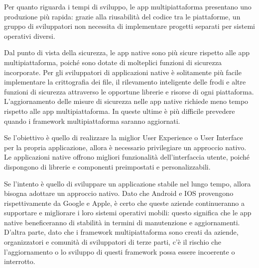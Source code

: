 Per quanto riguarda i tempi di sviluppo, le app multipiattaforma presentano uno produzione pi\`u rapida: grazie alla riusabilit\`a del codice tra le piattaforme, un gruppo di sviluppatori
non necessita di implementare progetti separati per sistemi operativi diversi.

Dal punto di vista della sicurezza, le app native sono pi\`u sicure rispetto alle app multipiattaforma, poich\'e sono dotate di molteplici funzioni di sicurezza incorporate.
Per gli sviluppatori di applicazioni native \`e solitamente pi\`u facile implementare la crittografia dei file, il rilevamento inteligente delle frodi e altre
funzioni di sicurezza attraverso le opportune librerie e risorse di ogni piattaforma. L'aggiornamento delle misure di sicurezza nelle app native richiede meno tempo rispetto alle app multipiattaforma.
In queste ultime \`e pi\`u difficile prevedere quando i framework multipiattaforma saranno aggiornati.

Se l'obiettivo \`e quello di realizzare la miglior User Experience o User Interface per la propria applicazione, allora \`e necessario privilegiare un approccio nativo. Le applicazioni native offrono migliori funzionalit\`a
dell'interfaccia utente, poich\'e dispongono di librerie e componenti preimpostati e personalizzabili.

Se l'intento \`e quello di sviluppare un applicazione stabile nel lungo tempo, allora bisogna adottare un approccio nativo. Dato che Android e IOS provengono rispettivamente da Google e Apple,
\`e certo che queste aziende continueranno a supportare e migliorare i loro sistemi operativi mobili: questo significa che le app native beneficeranno di stabilit\`a in termini di manutenzione e aggiornamenti. D'altra parte, dato che i framework multipiattaforma sono creati da aziende, organizzatori e comunit\`a di sviluppatori di terze parti, c'\`e il rischio che l'aggiornamento o lo sviluppo di questi
framework possa essere incoerente o interrotto.




